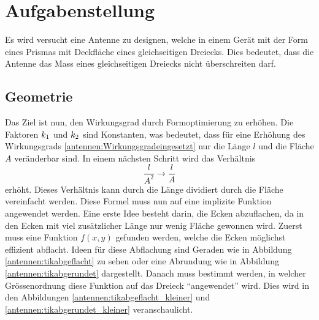 %
%
% 
%
%

\section{Aufgabenstellung\label{antennen:problemstellung}}
 Es wird versucht eine Antenne zu designen, welche in einem Gerät mit der Form 
 eines Prismas mit Deckfläche eines gleichseitigen Dreiecks. Dies bedeutet, dass 
 die Antenne das Mass eines gleichseitigen Dreiecks nicht überschreiten darf.
 
\subsection{Geometrie\label{antennen:Geom}}
Das Ziel ist nun, den Wirkungsgrad durch Formoptimierung zu erhöhen. 
Die Faktoren $k\textsubscript{1}$ und $k\textsubscript{2}$ sind Konstanten, 
was bedeutet, dass für eine Erhöhung des Wirkungsgrads \eqref{antennen:Wirkungsgradeingesetzt} nur die Länge 
$l$ und die Fläche $A$ veränderbar sind. In einem nächsten Schritt wird das Verhältnis
\begin{equation}
	\frac{l}{A^2} \rightarrow \frac{l}{A}
	\label{antennen:Verhältnis}
\end{equation}
erhöht. Dieses Verhältnis kann durch die Länge dividiert durch die Fläche 
vereinfacht werden. Diese Formel muss nun auf eine implizite Funktion angewendet 
werden. Eine erste Idee besteht darin, die Ecken abzuflachen, da in den Ecken 
mit viel zusätzlicher Länge nur wenig Fläche gewonnen wird. Zuerst muss eine 
Funktion $f(x,y)$ gefunden werden, welche die Ecken möglichst effizient abflacht. 
Ideen für diese Abflachung sind Geraden wie in Abbildung \ref{antennen:tikabgeflacht} 
zu sehen oder eine Abrundung wie in Abbildung \ref{antennen:tikabgerundet} dargestellt.
 Danach muss bestimmt werden, in welcher Grössenordnung diese Funktion auf das 
 Dreieck ``angewendet''  wird. Dies wird in den Abbildungen \ref{antennen:tikabgeflacht_kleiner} 
 und \ref{antennen:tikabgerundet_kleiner} veranschaulicht.

